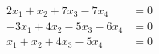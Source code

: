 \begin{align*}
2x_1  + x_2 + 7x_3 - 7x_4 &= 0 \\
-3x_1 + 4x_2 -5x_3 - 6x_4 &=  0 \\
x_1 +x_2 + 4x_3 - 5x_4 &=  0  
\end{align*}